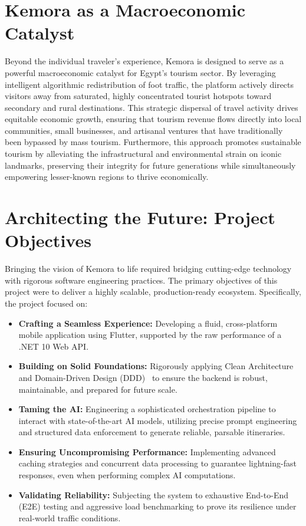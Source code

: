 \section{Kemora as a Macroeconomic Catalyst}
Beyond the individual traveler's experience, Kemora is designed to serve as a powerful macroeconomic catalyst for Egypt's tourism sector. By leveraging intelligent algorithmic redistribution of foot traffic, the platform actively directs visitors away from saturated, highly concentrated tourist hotspots toward secondary and rural destinations. This strategic dispersal of travel activity drives equitable economic growth, ensuring that tourism revenue flows directly into local communities, small businesses, and artisanal ventures that have traditionally been bypassed by mass tourism. Furthermore, this approach promotes sustainable tourism by alleviating the infrastructural and environmental strain on iconic landmarks, preserving their integrity for future generations while simultaneously empowering lesser-known regions to thrive economically.

\section{Architecting the Future: Project Objectives}
Bringing the vision of Kemora to life required bridging cutting-edge technology with rigorous software engineering practices. The primary objectives of this project were to deliver a highly scalable, production-ready ecosystem. Specifically, the project focused on:

\begin{itemize}
    \item \textbf{Crafting a Seamless Experience:} Developing a fluid, cross-platform mobile application using Flutter, supported by the raw performance of a .NET 10 Web API.
    \item \textbf{Building on Solid Foundations:} Rigorously applying Clean Architecture~\cite{martin2012clean} and Domain-Driven Design (DDD)~\cite{evans2003domain} to ensure the backend is robust, maintainable, and prepared for future scale.
    \item \textbf{Taming the AI:} Engineering a sophisticated orchestration pipeline to interact with state-of-the-art AI models, utilizing precise prompt engineering and structured data enforcement to generate reliable, parsable itineraries.
    \item \textbf{Ensuring Uncompromising Performance:} Implementing advanced caching strategies and concurrent data processing to guarantee lightning-fast responses, even when performing complex AI computations.
    \item \textbf{Validating Reliability:} Subjecting the system to exhaustive End-to-End (E2E) testing and aggressive load benchmarking to prove its resilience under real-world traffic conditions.
\end{itemize}

